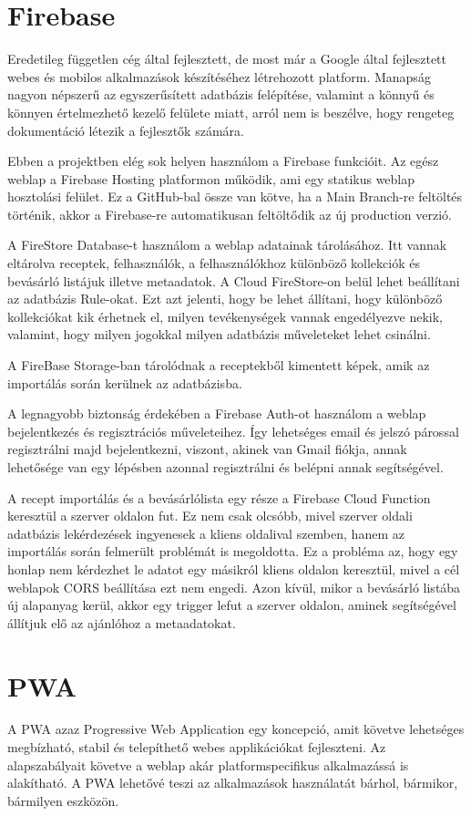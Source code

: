 \documentclass[12pt]{report}
\theoremstyle{definition}
\begin{document}
\section{Firebase}
Eredetileg független cég által fejlesztett, de most már a Google által fejlesztett webes és mobilos alkalmazások készítéséhez létrehozott platform. Manapság nagyon népszerű az egyszerűsített adatbázis felépítése, valamint a könnyű és könnyen értelmezhető kezelő felülete miatt, arról nem is beszélve, hogy rengeteg dokumentáció létezik a fejlesztők számára.

Ebben a projektben elég sok helyen használom a Firebase funkcióit. Az egész weblap a Firebase Hosting platformon működik, ami egy statikus weblap hosztolási felület. Ez a GitHub-bal össze van kötve, ha a Main Branch-re feltöltés történik, akkor a Firebase-re automatikusan feltöltődik az új production verzió.

A FireStore Database-t használom a weblap adatainak tárolásához. Itt vannak eltárolva  receptek, felhasználók, a felhasználókhoz különböző kollekciók és bevásárló listájuk illetve metaadatok. A Cloud FireStore-on belül lehet beállítani az adatbázis Rule-okat. Ezt azt jelenti, hogy be lehet állítani, hogy különböző kollekciókat kik érhetnek el, milyen tevékenységek vannak engedélyezve nekik, valamint, hogy milyen jogokkal milyen adatbázis műveleteket lehet csinálni. 

A FireBase Storage-ban tárolódnak a receptekből kimentett képek, amik az importálás során kerülnek az adatbázisba.

A legnagyobb biztonság érdekében a Firebase Auth-ot használom a weblap bejelentkezés és regisztrációs műveleteihez. Így lehetséges email és jelszó párossal regisztrálni majd bejelentkezni, viszont, akinek van Gmail fiókja, annak lehetősége van egy lépésben azonnal regisztrálni és belépni annak segítségével.

A recept importálás és a bevásárlólista egy része a Firebase Cloud Function keresztül a szerver oldalon fut. Ez nem csak olcsóbb, mivel szerver oldali adatbázis lekérdezések ingyenesek a kliens oldalival szemben, hanem az importálás során felmerült problémát is megoldotta. Ez a  probléma az, hogy egy honlap nem kérdezhet le adatot egy másikról kliens oldalon keresztül, mivel a cél weblapok CORS beállítása ezt nem engedi. Azon kívül, mikor a bevásárló listába új alapanyag kerül, akkor egy trigger lefut a szerver oldalon, aminek segítségével állítjuk elő az ajánlóhoz a metaadatokat.


\section{PWA}
A PWA azaz Progressive Web Application egy koncepció, amit követve lehetséges megbízható, stabil és telepíthető webes applikációkat fejleszteni. Az alapszabályait követve a weblap akár platformspecifikus alkalmazássá is alakítható. A PWA lehetővé teszi az alkalmazások használatát bárhol, bármikor, bármilyen eszközön. 
\end{document}
